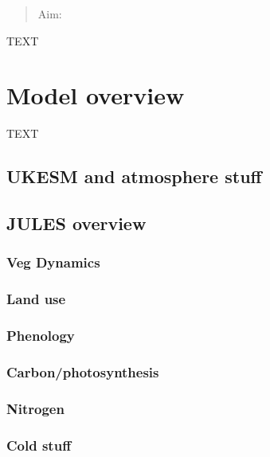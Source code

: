 \documentclass[bg, manuscript]{copernicus}
\begin{document}
\maketitle



\begin{abstract}
Aim:
\citep{Sellar2019-bo}

\end{abstract}




\introduction  %
TEXT


\section{Model overview}
TEXT

\subsection{UKESM and atmosphere stuff}

\subsection{JULES overview}

\subsubsection{Veg Dynamics}

\subsubsection{Land use}

\subsubsection{Phenology}

\subsubsection{Carbon/photosynthesis}

\subsubsection{Nitrogen}

\subsubsection{Cold stuff}
\end{document}
